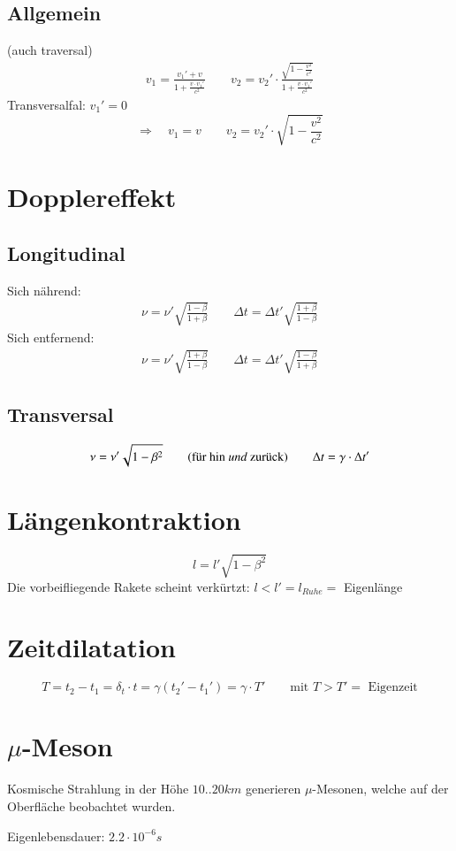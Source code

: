 \subsection{Allgemein}
(auch traversal)
\begin{gather}
	v_1=\frac{v_1'+v}{1+\frac{v\cdot v_1'}{c^2}}
	\qquad
	v_2 = v_2'\cdot\frac{\sqrt{1-\frac{v^2}{c^2}}}{1+\frac{v\cdot v_1'}{c^2}}
\end{gather}
\noindent Transversalfal: $v_1'=0$
\begin{equation*}
	\Longrightarrow\quad v_1=v\qquad v_2=v_2'\cdot\sqrt{1-\frac{v^2}{c^2}}
\end{equation*}

\section{Dopplereffekt}
\subsection{Longitudinal}
\noindent Sich n\"ahrend:
\begin{gather}
	\nu=\nu'\sqrt{\frac{1-\beta}{1+\beta}}\qquad \Delta t=\Delta t'\sqrt{\frac{1+\beta}{1-\beta}}
\end{gather}
\noindent Sich entfernend:
\begin{gather}
	\nu=\nu'\sqrt{\frac{1+\beta}{1-\beta}}\qquad \Delta t=\Delta t'\sqrt{\frac{1-\beta}{1+\beta}}
\end{gather}

\subsection{Transversal}
\begin{equation}
	\nu=\nu'\sqrt{1-\beta^2}\qquad\text{(f\"ur hin {\em und} zur\"uck)}\qquad\Delta t=\gamma\cdot\Delta t'
\end{equation}

\section{L\"angenkontraktion}
\begin{equation}
	l=l'\sqrt{1-\beta^2}
\end{equation}
\noindent Die vorbeifliegende Rakete scheint verk\"urtzt: $l<l'=l_{Ruhe}=$ Eigenl\"ange

\section{Zeitdilatation}
\begin{equation}
	T=t_2-t_1=\delta_t\cdot t=\gamma(t_2'-t_1')=\gamma\cdot T'\qquad\text{mit }T>T'=\text{ Eigenzeit}
\end{equation}

\section{$\mu$-Meson}
\noindent Kosmische Strahlung in der H\"ohe $10..20km$ generieren $\mu$-Mesonen, welche auf der Oberfl\"ache beobachtet wurden.

\noindent Eigenlebensdauer: $2.2\cdot 10^{-6}\unit{s}$

%
%
